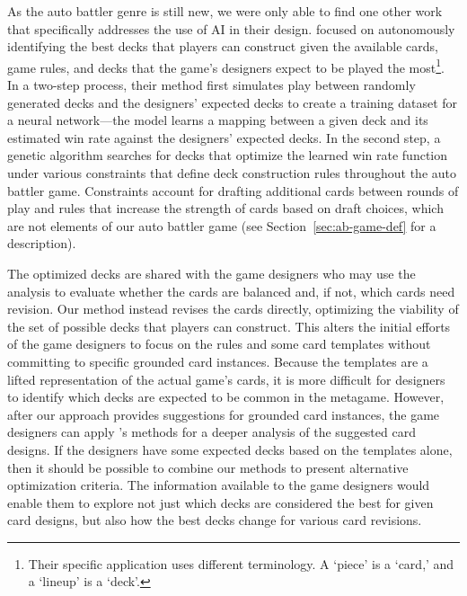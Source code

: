 As the auto battler genre is still new, we were only able to find one other work
that specifically addresses the use of AI in their design.  \citeauthor{tencent_autobattle_lineup}
 focused on autonomously identifying the
best decks that players can construct given the available cards, game rules, and
decks that the game's designers expect to be played the most\footnote{Their specific application uses different terminology. A `piece' is a `card,' and a `lineup' is a `deck'.}.  In a two-step process,
their method first simulates play between randomly generated decks and the designers'
expected decks to create a training dataset for a neural network---the model
learns a mapping between a given deck and its estimated win rate against the
designers' expected decks.  In the second step, a genetic algorithm searches for
decks that optimize the learned win rate function under various constraints that
define deck construction rules throughout the auto battler game.  Constraints
account for drafting additional cards between rounds of play and rules that
increase the strength of cards based on draft choices, which are not elements of
our auto battler game (see Section~\ref{sec:ab-game-def} for a description).

The optimized decks are shared with the game designers who may use the
analysis to evaluate whether the cards are balanced and, if not, which
cards need revision.  Our method instead revises the cards directly, optimizing
the viability of the set of possible decks that players can construct.  This alters
the initial efforts of the game designers to focus on the rules and some card templates
without committing to specific grounded card instances.  Because the templates are
a lifted representation of the actual game's cards, it is more difficult for designers
to identify which decks are expected to be common in the metagame.  However, after
our approach provides suggestions for grounded card instances, the game designers
can apply \citeauthor{tencent_autobattle_lineup}'s methods for a deeper analysis
of the suggested card designs.  If the designers have some expected decks based
on the templates alone, then it should be possible to combine our methods to
present alternative optimization criteria.  The information available to the game
designers would enable them to explore not just which decks are considered the
best for given card designs, but also how the best decks change for various card
revisions.

